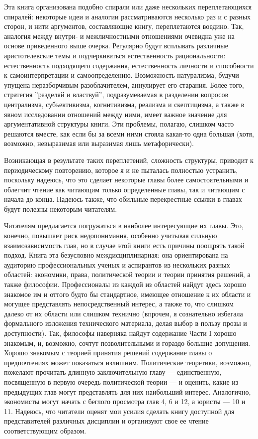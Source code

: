 \documentclass[11pt]{book}
\begin{document}
Эта книга организована подобно спирали или даже нескольких переплетающихся спиралей: некоторые идеи и аналогии рассматриваются несколько раз и с разных сторон, и нити аргументов, составляющие книгу, переплетаются воедино. Так, аналогия между внутри- и межличностными отношениями очевидна уже на основе приведенного выше очерка. Регулярно будут всплывать различные аристотелевские темы и подчеркиваться естественность рациональности: естественность подходящего содержания, естественность личности и способности к самоинтерпретации и самоопределению. Возможность натурализма, будучи упущена неразборчивым разоблачителем, аннулирует его старания. Более того, стратегия ''разделяй и властвуй'', подразумеваемая в разделении вопросов централизма, субъективизма, когнитивизма, реализма и скептицизма, а также в явном исследовании отношений между ними, имеет важное значение для аргументативной структуры книги. Эти проблемы, полагаю, слишком часто решаются вместе, как если бы за всеми ними стояла какая-то одна большая (хотя, возможно, невыразимая или выразимая лишь метафорически).

Возникающая в результате таких переплетений, сложность структуры, приводит к периодическому повторению, которое я и не пыталась полностью устранить, поскольку надеюсь, что это сделает некоторые главы более самостоятельными и облегчит чтение как читающим только определенные главы, так и читающим с начала до конца. Надеюсь также, что обильные перекрестные ссылки в главах будут полезны некоторым читателям.

Читателям предлагается погружаться в наиболее интересующие их главы. Это, конечно, повышает риск недопонимания, особенно учитывая сильную взаимозависимость глав, но в случае этой книги есть причины поощрять такой подход. Книга эта безусловно междисциплинарная: она ориентирована на аудиторию профессиональных ученых и аспирантов из нескольких разных областей: экономики, права, политической теории и теории принятия решений, а также философии. Профессионалы из каждой из областей найдут здесь хорошо знакомое им и оттого будто бы стандартное, имеющее отношение к их области и могущее представлять непосредственный интерес, а также то, что слишком далеко от их области или слишком технично (впрочем, я сознательно избегала формального изложения технического материала, делая выбор в пользу прозы и доступности). Так, философы наверняка найдут содержание Части I хорошо знакомым, и, возможно, сочтут позволительными и гораздо большие допущения. Хорошо знакомым с теорией принятия решений содержание главы о предпочтениях может показаться излишним. Политические теоретики, возможно, пожелают прочитать длинную заключительную главу --- единственную, посвященную в первую очередь политической теории --- и оценить, какие из предыдущих глав могут представлять для них наибольший интерес. Аналогично, экономисты могут начать с беглого просмотра глав 4, 6 и 12, а юристы --- 10 и 11. Надеюсь, что читатели оценят мои усилия сделать книгу доступной для представителей различных дисциплин и организуют свое ее чтение соответствующим образом.
\end{document}
